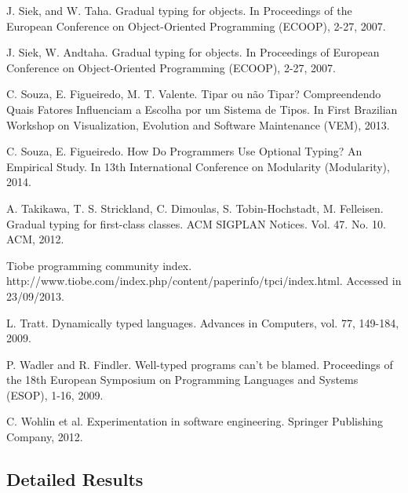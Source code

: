 \documentclass[msc]{ppgccufmg}
\begin{document}
\begin{thebibliography}{}
J. Siek, and W. Taha. Gradual typing for objects. In Proceedings of the European Conference on Object-Oriented Programming (ECOOP),  2-27, 2007.

J. Siek, W. Andtaha. Gradual typing for objects. In Proceedings of European Conference on Object-Oriented Programming (ECOOP), 2-27, 2007.

C. Souza, E. Figueiredo, M. T. Valente. Tipar ou não Tipar? Compreendendo Quais Fatores Influenciam a Escolha por um Sistema de Tipos. In First Brazilian Workshop on Visualization, Evolution and Software Maintenance (VEM), 2013. 

C. Souza, E. Figueiredo. How Do Programmers Use Optional Typing? An Empirical Study. In 13th International Conference on Modularity (Modularity), 2014.

A. Takikawa, T. S. Strickland, C. Dimoulas, S. Tobin-Hochstadt, M. Felleisen. Gradual typing for first-class classes. ACM SIGPLAN Notices. Vol. 47. No. 10. ACM, 2012.

Tiobe programming community index. http://www.tiobe.com/index.php/content/paperinfo/tpci/index.html. Accessed in 23/09/2013.

L. Tratt. Dynamically typed languages. Advances in Computers, vol. 77, 149-184, 2009.

P. Wadler and R. Findler. Well-typed programs can't be blamed. Proceedings of the 18th European Symposium on Programming Languages and Systems (ESOP), 1-16, 2009.

C. Wohlin et al. Experimentation in software engineering. Springer Publishing Company, 2012.

\end{thebibliography}


\begin{appendices}



\end{appendices}


\begin{attachments}


\chapter{Detailed Results\label{detailed_results}}


\end{attachments}
\end{document}
